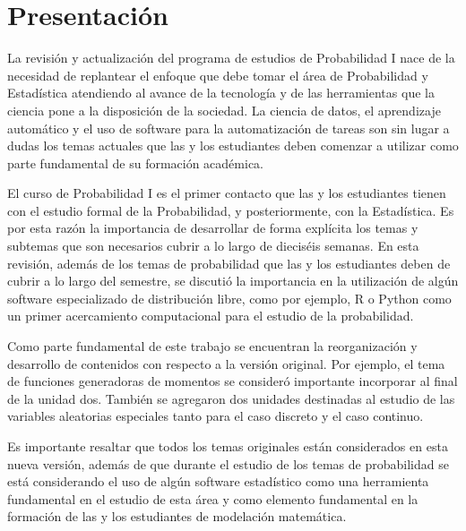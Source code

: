
\section{Presentaci\'on}

La revisi\'on y actualizaci\'on del programa de estudios de Probabilidad I nace de la necesidad de replantear el enfoque que debe tomar el \'area de Probabilidad y Estad\'istica atendiendo al avance de la tecnolog\'ia y de las herramientas que la ciencia pone a la disposici\'on de la sociedad. La ciencia de datos, el aprendizaje autom\'atico y el uso de software para la automatizaci\'on de tareas son sin lugar a dudas los temas actuales que las y los estudiantes deben comenzar a utilizar como parte fundamental de su formaci\'on acad\'emica.\medskip

El curso de Probabilidad I es el primer contacto que las y los estudiantes tienen con el estudio formal de la Probabilidad, y posteriormente, con la Estad\'istica. Es por esta raz\'on  la importancia de desarrollar de forma expl\'icita los temas y subtemas que son necesarios cubrir a lo largo de diecis\'eis semanas. En esta revisi\'on, adem\'as de los temas de probabilidad que las y los estudiantes deben de cubrir a lo largo del semestre, se discuti\'o la importancia en la utilizaci\'on de alg\'un software especializado de distribuci\'on libre, como por ejemplo, R o Python como un primer acercamiento computacional para el estudio de la probabilidad.\medskip

Como parte fundamental de este trabajo se encuentran la reorganizaci\'on y desarrollo de contenidos con respecto a la versi\'on original. Por ejemplo, el tema de funciones generadoras de momentos se consider\'o importante incorporar al final de la unidad dos. Tambi\'en se agregaron dos unidades destinadas al estudio de las variables aleatorias especiales tanto para el caso discreto y el caso continuo.\medskip

Es importante resaltar que todos los temas originales est\'an considerados en esta nueva versi\'on, adem\'as de que durante el estudio de los temas de probabilidad se est\'a considerando el uso de alg\'un software estad\'istico como una herramienta fundamental en el estudio de esta \'area y como elemento fundamental en la formaci\'on de las y los estudiantes de modelaci\'on matem\'atica.\medskip


